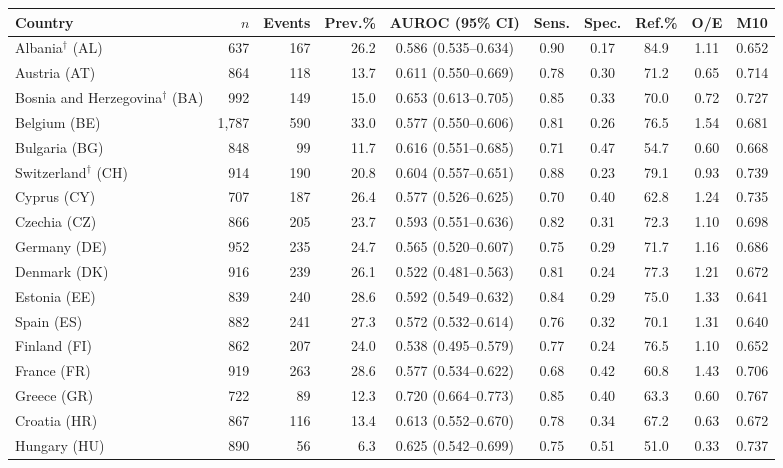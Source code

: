 \begin{center}\footnotesize\setlength{\tabcolsep}{4pt}
\begin{longtable}{@{}lrrrcccccc@{}}
\toprule Country & $n$ & Events & Prev.\% & AUROC (95\% CI) & Sens. & Spec. & Ref.\% & O/E & M10\\ \midrule\endhead
Albania$^\dagger$ (AL) & 637 & 167 & 26.2 & 0.586 (0.535--0.634) & 0.90 & 0.17 & 84.9 & 1.11 & 0.652\\
Austria (AT) & 864 & 118 & 13.7 & 0.611 (0.550--0.669) & 0.78 & 0.30 & 71.2 & 0.65 & 0.714\\
Bosnia and Herzegovina$^\dagger$ (BA) & 992 & 149 & 15.0 & 0.653 (0.613--0.705) & 0.85 & 0.33 & 70.0 & 0.72 & 0.727\\
Belgium (BE) & 1{,}787 & 590 & 33.0 & 0.577 (0.550--0.606) & 0.81 & 0.26 & 76.5 & 1.54 & 0.681\\
Bulgaria (BG) & 848 & 99 & 11.7 & 0.616 (0.551--0.685) & 0.71 & 0.47 & 54.7 & 0.60 & 0.668\\
Switzerland$^\dagger$ (CH) & 914 & 190 & 20.8 & 0.604 (0.557--0.651) & 0.88 & 0.23 & 79.1 & 0.93 & 0.739\\
Cyprus (CY) & 707 & 187 & 26.4 & 0.577 (0.526--0.625) & 0.70 & 0.40 & 62.8 & 1.24 & 0.735\\
Czechia (CZ) & 866 & 205 & 23.7 & 0.593 (0.551--0.636) & 0.82 & 0.31 & 72.3 & 1.10 & 0.698\\
Germany (DE) & 952 & 235 & 24.7 & 0.565 (0.520--0.607) & 0.75 & 0.29 & 71.7 & 1.16 & 0.686\\
Denmark (DK) & 916 & 239 & 26.1 & 0.522 (0.481--0.563) & 0.81 & 0.24 & 77.3 & 1.21 & 0.672\\
Estonia (EE) & 839 & 240 & 28.6 & 0.592 (0.549--0.632) & 0.84 & 0.29 & 75.0 & 1.33 & 0.641\\
Spain (ES) & 882 & 241 & 27.3 & 0.572 (0.532--0.614) & 0.76 & 0.32 & 70.1 & 1.31 & 0.640\\
Finland (FI) & 862 & 207 & 24.0 & 0.538 (0.495--0.579) & 0.77 & 0.24 & 76.5 & 1.10 & 0.652\\
France (FR) & 919 & 263 & 28.6 & 0.577 (0.534--0.622) & 0.68 & 0.42 & 60.8 & 1.43 & 0.706\\
Greece (GR) & 722 & 89 & 12.3 & 0.720 (0.664--0.773) & 0.85 & 0.40 & 63.3 & 0.60 & 0.767\\
Croatia (HR) & 867 & 116 & 13.4 & 0.613 (0.552--0.670) & 0.78 & 0.34 & 67.2 & 0.63 & 0.672\\
Hungary (HU) & 890 & 56 & 6.3 & 0.625 (0.542--0.699) & 0.75 & 0.51 & 51.0 & 0.33 & 0.737\\

\end{longtable}
\end{center}
